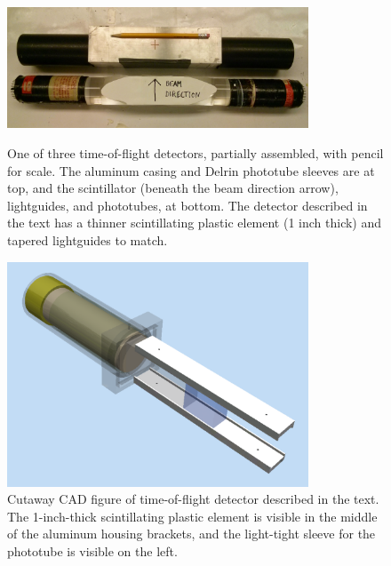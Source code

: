 \begin{figure}
    \centering
    \includegraphics[width=0.8\textwidth]{figures/Scintillator_disassembled.jpg}
    \caption[Time-of-flight detector partially assembled]
    {One of three time-of-flight detectors, partially assembled, with pencil for scale.
    The aluminum casing and Delrin phototube sleeves are at top, and the
scintillator (beneath the beam direction arrow), lightguides, and phototubes, at
bottom. The detector described in the text has a thinner scintillating plastic
element (1 inch thick) and tapered lightguides to match.}
    \label{TOFDetectorDisassembled}

    \vspace*{\floatsep}

    \centering
    \includegraphics[width=0.8\textwidth]{figures/TimeOfFlightCAD.png}
    \caption[Cutaway CAD figure of time-of-flight detector.]
{
    Cutaway CAD figure of time-of-flight detector described in the text. The 
    1-inch-thick scintillating plastic element is visible in the middle of the aluminum 
    housing brackets, and the light-tight sleeve for the phototube is visible on
    the left.
}
    \label{TOFCAD}
\end{figure}

